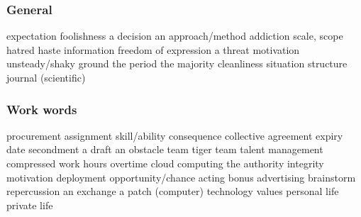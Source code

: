 \subsubsection*{General}
   {expectation}
   {foolishness}
   {a decision}
   {an approach/method}
   {addiction}
   {scale, scope}
   {hatred}
   {haste}
   {information}
   {freedom of expression}
   {a threat}
   {motivation}
   {unsteady/shaky ground}
   {the period}
   {the majority}
   {cleanliness}
   {situation}
   {structure}
   {journal (scientific)}
\subsubsection*{Work words}
   {procurement}
   {assignment}
   {skill/ability}
   {consequence}
   {collective agreement}
   {expiry date}
   {secondment}
   {a draft}
   {an obstacle}
   {team}
   {tiger team}
   {talent management}
   {compressed work hours}
   {overtime}
   {cloud computing}
   {the authority}
   {integrity}
   {motivation}
   {deployment}
   {opportunity/chance}
   {acting}
   {bonus}
   {advertising}
   {brainstorm}
   {repercussion}
   {an exchange}
   {a patch (computer)}
   {technology}
   {values}
   {personal life}
   {private life}
